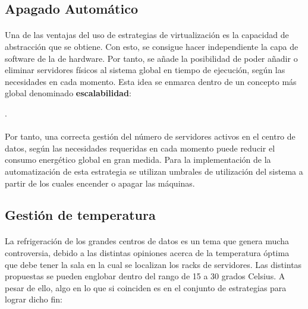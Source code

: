 \documentclass[12pt]{article}
\begin{document}
		\subsection{Apagado Automático}

			\paragraph{}
			Una de las ventajas del uso de estrategias de virtualización es la capacidad de abstracción que se obtiene. Con esto, se consigue hacer independiente la capa de software de la de hardware. Por tanto, se añade la posibilidad de poder añadir o eliminar servidores físicos al sistema global en tiempo de ejecución, según las necesidades en cada momento. Esta idea se enmarca dentro de un concepto más global denominado \textbf{escalabilidad}:

			\cite{wikipedia:escalabilidad}.

			\paragraph{}
			Por tanto, una correcta gestión del número de servidores activos en el centro de datos, según las necesidades requeridas en cada momento puede reducir el consumo energético global en gran medida. Para la implementación de la automatización de esta estrategia se utilizan umbrales de utilización del sistema a partir de los cuales encender o apagar las máquinas.


		\subsection{Gestión de temperatura}

			\paragraph{}
			La refrigeración de los grandes centros de datos es un tema que genera mucha controversia, debido a las distintas opiniones acerca de la temperatura óptima que debe tener la sala en la cual se localizan los racks de servidores. Las distintas propuestas se pueden englobar dentro del rango de 15 a 30 grados Celsius. A pesar de ello, algo en lo que si coinciden es en el conjunto de estrategias para lograr dicho fin:
\end{document}
